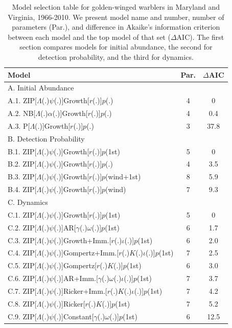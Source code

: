 \documentclass[12pt]{article}
\begin{document}
\vfill
\newpage

\begin{table}
  \centering
  \small
  \caption{Model selection table for golden-winged
    warblers in Maryland and Virginia, 1966-2010.  We present model name
    and number, number of parameters (Par.), and difference in Akaike's
    information criterion between each model and the top model of that
    set ($\Delta$AIC).  The first section compares
    models for initial abundance, the second for detection probability,
    and the third for dynamics.}
  \begin{tabular}[h]{lcc}
\hline
Model	&Par.	&$\Delta$AIC\\
\hline
A. Initial Abundance && \\
A.1. ZIP[$\Lambda$(.)$\psi$(.)]Growth[$r$(.)]$p$(.)	&4	&0 \\
A.2. NB[$\Lambda$(.)$\alpha$(.)]Growth[$r$(.)]$p$(.)	&4	&0.4 \\
A.3. P[$\Lambda$(.)]Growth[$r$(.)]$p$(.)	&3	&37.8 \\
\hline
B. Detection Probability && \\
B.1. ZIP[$\Lambda$(.)$\psi$(.)]Growth[$r$(.)]$p$(1st)	&5
&0 \\
B.2. ZIP[$\Lambda$(.)$\psi$(.)]Growth[$r$(.)]$p$(.)	&4	&3.5 \\
B.3. ZIP[$\Lambda$(.)$\psi$(.)]Growth[$r$(.)]$p$(wind+1st)	&8
&5.9 \\
B.4. ZIP[$\Lambda$(.)$\psi$(.)]Growth[$r$(.)]$p$(wind)	&7	&9.3 \\
\hline
C. Dynamics && \\
C.1. ZIP[$\Lambda$(.)$\psi$(.)]Growth[$r$(.)]$p$(1st)
&5	&0 \\
C.2. ZIP[$\Lambda$(.)$\psi$(.)]AR[$\gamma$(.)$\omega$(.)]$p$(1st)
&6	&1.7 \\
C.3. ZIP[$\Lambda$(.)$\psi$(.)]Growth+Imm.[$r$(.)$\iota$(.)]$p$(1st)
&6	&2.0 \\
C.4. ZIP[$\Lambda$(.)$\psi$(.)]Gompertz+Imm.[$r$(.)$K$(.)$\iota$(.)]$p$(1st)
&7	&2.5 \\
C.5. ZIP[$\Lambda$(.)$\psi$(.)]Gompertz[$r$(.)$K$(.)]$p$(1st)	&6
&3.0 \\
C.6. ZIP[$\Lambda$(.)$\psi$(.)]AR+Imm.[$\gamma$(.)$\omega$(.)$\iota$(.)]$p$(1st)
&7	&3.7 \\
C.7. ZIP[$\Lambda$(.)$\psi$(.)]Ricker+Imm.[$r$(.)$K$(.)$\iota$(.)]$p$(1st)
&7	&4.2 \\
C.8. ZIP[$\Lambda$(.)$\psi$(.)]Ricker[$r$(.)$K$(.)]$p$(1st)	&7
&5.2 \\
C.9. ZIP[$\Lambda$(.)$\psi$(.)]Constant[$\gamma$(.)$\omega$(.)]$p$(1st)
&6	&12.5 \\
\hline
\end{tabular}
\end{table}
\end{document}
